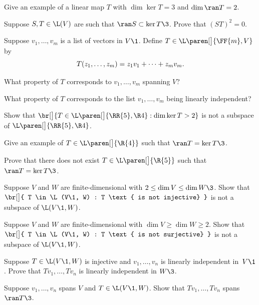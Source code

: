 
\exercise
Give an example of a linear map $T$ with $\dim \ker T = 3$ and $\dim \ran T = 2$.


\exercise
Suppose $S, T \in \L(V)$ are such that
$
\ran S \subset \ker T\3$.
Prove that $(ST)^2 = 0$.


\exercise
Suppose $v_1, \dots, v_m$ is a list of vectors in $V\1$.  Define $T \in \L\paren[\big]{\FF{m}, V}$ by
\[ \addtolength{\belowdisplayskip}{-3bp}
T(z_1, \dots, z_m) = z_1 v_1 + \dots + z_m v_m.
\]
\begin{subtheorem}
\item
What property of $T$ corresponds to $v_1, \dots, v_m$ spanning $V$?
\item
What property of $T$ corresponds to the list $v_1, \dots, v_m$ being linearly \mbox{independent}?
\end{subtheorem}
\exercisesubtheoremend


\exercise
Show that
$
\br[\big]{T \in \L\paren[\big]{\RR{5}, \R4}: \dim \ker T > 2}
$
is not a subspace of $ \L\paren[\big]{\RR{5}, \R4}$.


\exercise
Give an example of $T \in \L\paren[\big]{\R{4}}$ such that $\ran T = \ker T\3$.


\exercise
Prove that there does not exist $T \in \L\paren[\big]{\R{5}}$ such that $\ran T = \ker T\3$.


\exercise
Suppose $V$ and $W$ are finite-dimensional with $2 \le \dim V \le \dim W\3$. Show that
$
\br[\big]{ T \in \L(V\1, W) : T \text{ is not injective} }
$
is not a subspace of $\L(V\1, W)$.


\exercise
Suppose $V$ and $W$ are finite-dimensional with $\dim V \ge \dim W \ge 2$. Show that
$
\br[\big]{ T \in \L(V\1, W) : T \text{ is not surjective} }
$
is not a subspace of $\L(V\1, W)$.


\exercise
Suppose $T \in \L(V\1,W)$ is injective and $v_1, \dots, v_n$ is linearly independent in~$V\1$.  Prove that $Tv_1, \dots, Tv_n$ is linearly independent in $W\3$.\label{3001}


\exercise
Suppose $v_1, \dots, v_n$ spans $V$ and $T \in \L(V\1,W)$. Show
that $Tv_1, \dots, Tv_n$ spans $\ran T\3$.\label{3spanrange}

